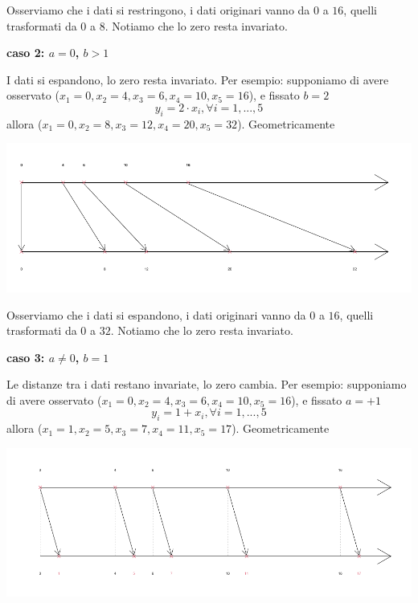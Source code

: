 \documentclass[
  11pt,
]{book}
\theoremstyle{mytheoremstyle}
\theoremstyle{mydefstyle}
\begin{document}
Osserviamo che i dati si restringono, i dati originari vanno da \(0\) a \(16\), quelli trasformati da \(0\) a \(8\). Notiamo che lo zero resta invariato.

\textbf{caso 2: \(a= 0\), \(b>1\)}

I dati si espandono, lo zero resta invariato.
Per esempio: supponiamo di avere osservato (\(x_1=0, x_2=4, x_3=6, x_4=10, x_5=16\)), e fissato \(b=2\)
\[
y_i= 2\cdot x_i, \forall i = 1,...,5
\]
allora (\(x_1=0, x_2=8, x_3=12, x_4=20, x_5=32\)). Geometricamente

\begin{center}\includegraphics{Appunti_di_Statistica_2025_files/figure-latex/tranf-lin-gr2-1} \end{center}

Osserviamo che i dati si espandono, i dati originari vanno da \(0\) a \(16\), quelli trasformati da \(0\) a \(32\). Notiamo che lo zero resta invariato.

\textbf{caso 3: \(a\ne 0\), \(b=1\)}

Le distanze tra i dati restano invariate, lo zero cambia.
Per esempio: supponiamo di avere osservato (\(x_1=0, x_2=4, x_3=6, x_4=10, x_5=16\)), e fissato \(a=+1\)
\[
y_i= 1 + x_i, \forall i = 1,...,5
\]
allora (\(x_1=1, x_2=5, x_3=7, x_4=11, x_5=17\)). Geometricamente

\begin{center}\includegraphics{Appunti_di_Statistica_2025_files/figure-latex/tranf-lin-gr3-1} \end{center}
\end{document}
